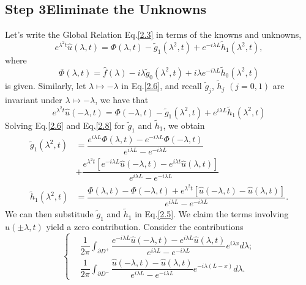\documentclass[12pt]{article}
\numberwithin{equation}{section}
\begin{document}
\subsection{Step 3\textemdash Eliminate the Unknowns}
Let's write the Global Relation Eq.\eqref{2.3} in terms of the knowns and unknowns,
\begin{equation}\label{2.6}
    e^{\lambda^2 t}\hat{u}(\lambda,t)=\Phi(\lambda,t)-\tilde{g}_1(\lambda^2,t)+e^{-i\lambda L}\tilde{h}_1(\lambda^2,t),
\end{equation}
where 
\begin{equation}
    \Phi(\lambda,t)=\hat{f}(\lambda)-i\lambda\tilde{g}_0(\lambda^2,t)+i\lambda e^{-i\lambda L}\tilde{h}_0(\lambda^2,t)
\end{equation}
is given. Similarly, let $\lambda\mapsto -\lambda$ in Eq.\eqref{2.6}, and recall $\tilde{g}_j$, $\tilde{h}_j$ $(j=0,1)$ are invariant under $\lambda\mapsto -\lambda$, we have that 
\begin{equation}\label{2.8}
    e^{\lambda^2 t}\hat{u}(-\lambda,t)=\Phi(-\lambda,t)-\tilde{g}_1(\lambda^2,t)+e^{i\lambda L}\tilde{h}_1(\lambda^2,t)
\end{equation}
Solving Eq.\eqref{2.6} and Eq.\eqref{2.8} for $\tilde{g}_1$ and $\tilde{h}_1$, we obtain
\begin{equation}
    \begin{split}
        \tilde{g}_1(\lambda^2,t)&=\dfrac{e^{i\lambda L}\Phi(\lambda,t)-e^{-i\lambda L}\Phi(-\lambda,t)}{e^{i\lambda L}-e^{-i\lambda L}}\\
        &+\dfrac{e^{\lambda^2 t}[e^{-i\lambda L}\hat{u}(-\lambda,t)-e^{i\lambda t}\hat{u}(\lambda,t)]}{e^{i\lambda L}-e^{-i\lambda L}}\\
        \tilde{h}_1(\lambda^2,t)&=\dfrac{\Phi(\lambda,t)-\Phi(-\lambda,t)+e^{\lambda^2 t}[\hat{u}(-\lambda,t)-\hat{u}(\lambda,t)]}{e^{i\lambda L}-e^{-i\lambda L}}.
    \end{split}
\end{equation}
We can then substitude $\tilde{g}_1$ and $\tilde{h}_1$ in Eq.\eqref{2.5}. We claim the terms involving $\hat{u}(\pm\lambda,t)$ yield a zero contribution. Consider the contributions
\begin{equation}\label{2.10}
    \begin{cases}
         &\dfrac{1}{2\pi}\displaystyle\int_{\partial D^+}\dfrac{e^{-i\lambda L}\hat{u}(-\lambda,t) -e^{i\lambda L}\hat{u}(\lambda,t)}{e^{i\lambda L}-e^{-i\lambda L}} e^{i\lambda x}d\lambda ;\\[5mm] 
         &\dfrac{1}{2\pi}\displaystyle\int_{\partial D^-}\dfrac{\hat{u}(-\lambda,t)-\hat{u}(\lambda,t)}{e^{i\lambda L}-e^{-i\lambda L}} e^{-i\lambda (L-x)}d\lambda .
    \end{cases}
\end{equation}
\end{document}
